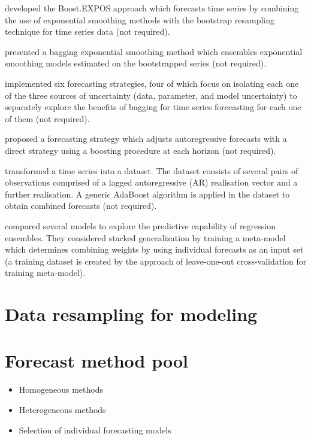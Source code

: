 \documentclass[11pt]{article}
\begin{document}
\cite{cordeiro2009forecasting} developed the Boost.EXPOS approach which forecasts time series by combining the use of exponential smoothing methods with the bootstrap resampling technique for time series data (not required).

\cite{bergmeir2016bagging} presented a bagging exponential smoothing method which ensembles exponential smoothing models estimated on the bootstrapped series (not required).

\cite{petropoulos2018exploring} implemented six forecasting strategies, four of which focus on isolating each one of the three sources of uncertainty (data, parameter, and model uncertainty) to separately explore the benefits of bagging for time series forecasting for each one of them (not required).

\cite{taieb2014boosting} proposed a forecasting strategy which adjusts autoregressive forecasts with a direct strategy using a boosting procedure at each horizon (not required).

\cite{barrow2016comparison} transformed a time series into a dataset. The dataset consists of several pairs of observations comprised of a lagged autoregressive (AR) realisation vector and a further realisation. A generic AdaBoost algorithm is applied in the dataset to obtain combined forecasts (not required).

\cite{ribeiro2020ensemble} compared several models to explore the predictive capability of regression ensembles. They considered stacked generalization by training a meta-model which determines combining weights by using individual forecasts as an input set (a training dataset is created by the approach of leave-one-out cross-validation for training meta-model).


\section{Data resampling for modeling}


\section{Forecast method pool}
\begin{itemize}
\item Homogeneous methods
\item Heterogeneous methods
\item Selection of individual forecasting models
\end{itemize}
\end{document}
